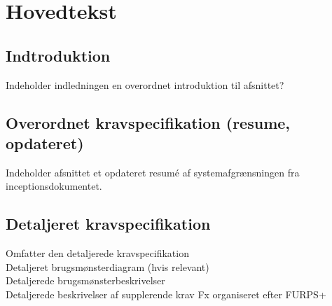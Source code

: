 \chapter{Hovedtekst}

\section{Indtroduktion}
Indeholder indledningen en overordnet introduktion til afsnittet?\\

\section{Overordnet kravspecifikation (resume, opdateret)}
Indeholder afsnittet et opdateret resumé  af systemafgrænsningen fra inceptionsdokumentet.

\section{Detaljeret kravspecifikation}
Omfatter den detaljerede kravspecifikation\\
Detaljeret brugsmønsterdiagram (hvis relevant)\\
Detaljerede brugsmønsterbeskrivelser\\
Detaljerede beskrivelser af supplerende krav Fx organiseret efter FURPS+\\




